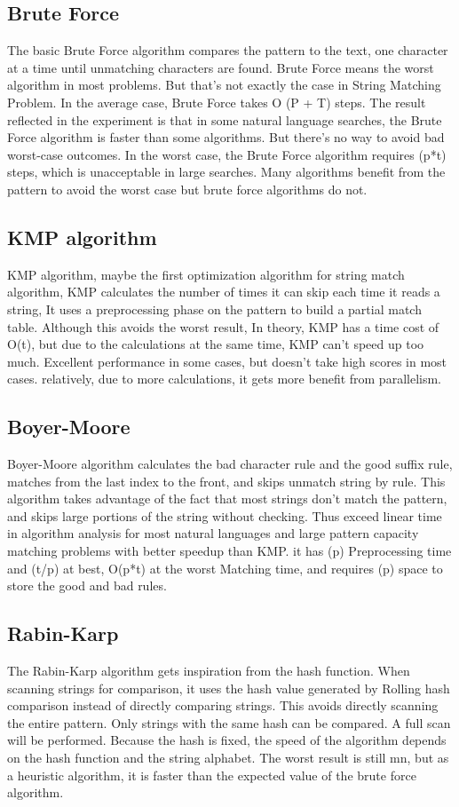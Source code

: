 \documentclass[11pt]{article}       %
\begin{document}
\subsection{Brute Force}\label{bf}
The basic Brute Force algorithm compares the pattern to the text, one character at a time until unmatching characters are found. Brute Force means the worst algorithm in most problems. But that's not exactly the case in String Matching Problem. In the average case, Brute Force takes O (P + T) steps. The result reflected in the experiment is that in some natural language searches, the Brute Force algorithm is faster than some algorithms. But there's no way to avoid bad worst-case outcomes. In the worst case, the Brute Force algorithm requires (p*t) steps, which is unacceptable in large searches. Many algorithms benefit from the pattern to avoid the worst case but brute force algorithms do not.

\subsection{KMP algorithm}\label{kmp}
KMP algorithm, maybe the first optimization algorithm\cite{KMP} for string match algorithm, KMP calculates the number of times it can skip each time it reads a string, It uses a preprocessing phase on the pattern to build a partial match table. Although this avoids the worst result, In theory, KMP has a time cost of O(t), but due to the calculations at the same time, KMP can’t speed up too much. Excellent performance in some cases, but doesn’t take high scores in most cases. relatively, due to more calculations, it gets more benefit from parallelism.

\subsection{Boyer-Moore}\label{bm}
Boyer-Moore algorithm calculates the bad character rule and the good suffix rule\cite{BM}, matches from the last index to the front, and skips unmatch string by rule. This algorithm takes advantage of the fact that most strings don’t match the pattern, and skips large portions of the string without checking. Thus exceed linear time in algorithm analysis for most natural languages and large pattern capacity matching problems with better speedup than KMP. it has (p) Preprocessing time and  (t/p) at best, O(p*t) at the worst Matching time, and requires (p) space to store the good and bad rules.


\subsection{Rabin-Karp}\label{rk}
The Rabin-Karp algorithm gets inspiration from the hash function. When scanning strings for comparison, it uses the hash value generated by Rolling hash comparison instead of directly comparing strings\cite{KR}. This avoids directly scanning the entire pattern. Only strings with the same hash can be compared. A full scan will be performed. Because the hash is fixed, the speed of the algorithm depends on the hash function and the string alphabet. The worst result is still mn, but as a heuristic algorithm, it is faster than the expected value of the brute force algorithm.
\end{document}
